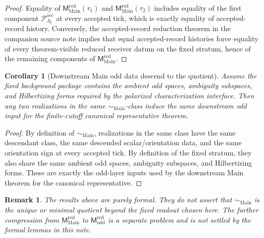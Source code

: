 \documentclass[11pt]{article}
\newtheorem{corollary}{Corollary}
\newtheorem{remark}{Remark}
\newcommand{\MMain}{\mathsf M^{\mathrm{red}}_{\mathrm{Main}}}
\newcommand{\MOdd}{\mathsf M^{\mathrm{red}}_{\mathrm{odd}}}
\begin{document}
\begin{proof}
Equality of \(\MMain(\tau_1)\) and \(\MMain(\tau_2)\) includes equality of the first component
\(\mathcal P^{\mathrm{acc}}_{\Lambda_k}\) at every accepted tick, which is exactly equality of
accepted-record history.
Conversely, the accepted-record reduction theorem in the companion source note implies that equal
accepted-record histories force equality of every theorem-visible reduced receiver datum on the fixed
stratum, hence of the remaining components of \(\MMain\).
\end{proof}

\begin{corollary}[Downstream Main odd data descend to the quotient]
Assume the fixed background package contains the ambient odd spaces, ambiguity subspaces, and
Hilbertizing forms required by the polarized characterization interface.
Then any two realizations in the same \(\sim_{\mathrm{Main}}\)-class induce the same downstream odd
input for the finite-cutoff canonical representative theorem.
\end{corollary}

\begin{proof}
By definition of \(\sim_{\mathrm{Main}}\), realizations in the same class have the same descendant
class, the same descended scalar/orientation data, and the same orientation sign at every accepted
tick.
By definition of the fixed stratum, they also share the same ambient odd spaces, ambiguity subspaces,
and Hilbertizing forms.
These are exactly the odd-layer inputs used by the downstream Main theorem for the canonical
representative.
\end{proof}

\begin{remark}
The results above are purely formal.
They do not assert that \(\sim_{\mathrm{Main}}\) is the unique or minimal quotient beyond the fixed
readout chosen here.
The further compression from \(\MMain\) to \(\MOdd\) is a separate problem and is not settled by the
formal lemmas in this note.
\end{remark}
\end{document}
